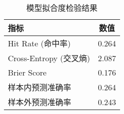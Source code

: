 \begin{table}[htbp]
\centering
\caption{模型拟合度检验结果}
\begin{tabular}{lc}
\toprule
指标 & 数值 \\
\midrule
Hit Rate (命中率) & 0.264 \\
Cross-Entropy (交叉熵) & 2.087 \\
Brier Score & 0.176 \\
样本内预测准确率 & 0.264 \\
样本外预测准确率 & 0.243 \\
\bottomrule
\end{tabular}
\end{table}